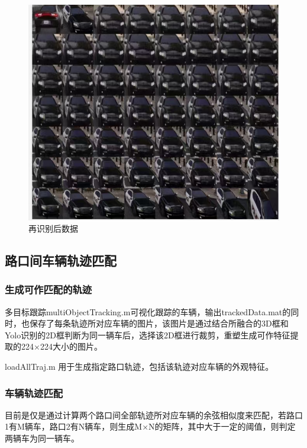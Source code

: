\begin{figure}[htbp] %
	\centering
	\includegraphics[width=1\textwidth]{p15} %
	\caption{再识别后数据} %
	\label{fig:p15} %
\end{figure}









\subsection{路口间车辆轨迹匹配}
\subsubsection{生成可作匹配的轨迹}
多目标跟踪multiObjectTracking.m可视化跟踪的车辆，输出trackedData.mat的同时，也保存了每条轨迹所对应车辆的图片，该图片是通过结合所融合的3D框和Yolo识别的2D框判断为同一辆车后，选择该2D框进行裁剪，重塑生成可作特征提取的224×224大小的图片。

loadAllTraj.m 用于生成指定路口轨迹，包括该轨迹对应车辆的外观特征。
\subsubsection{车辆轨迹匹配}
目前是仅是通过计算两个路口间全部轨迹所对应车辆的余弦相似度来匹配，若路口1有M辆车，路口2有N辆车，则生成M×N的矩阵，其中大于一定的阈值，则判定两辆车为同一辆车。

